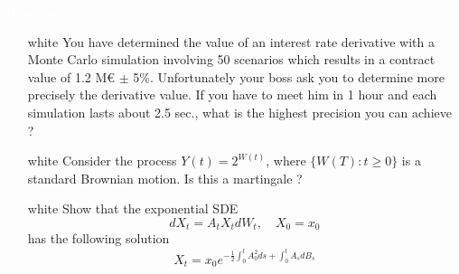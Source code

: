 \documentclass{beamer}
\begin{document}
\begin{homework}
\begin{frame}{\textcolor{white}{Homework}}
\begin{itemize}
\item[white]  You have determined the value of an interest rate derivative with a Monte Carlo simulation involving 50 scenarios which results in a contract value of 1.2 M€ $\pm$ 5\%. Unfortunately your boss ask you to determine more precisely the derivative value. If you have to meet him in 1 hour and each simulation lasts about 2.5 sec., what is the highest precision you can achieve ?
\item[white] Consider the process $Y(t) = 2^{W(t)}$, where $\{W(T):t\geq 0\}$ is a standard Brownian motion. Is this a martingale ?
\item[white]  Show that the exponential SDE
\begin{equation*}
dX_t = A_t X_tdW_t,\quad X_0=x_0
\end{equation*}
has the following solution
\begin{equation*}
X_t = x_0 e^{-\frac{1}{2}\int_0^t A_0^2 ds+\int_0^t A_s dB_s}
\end{equation*}
\end{itemize}
\end{frame}
\end{homework}
\end{document}
